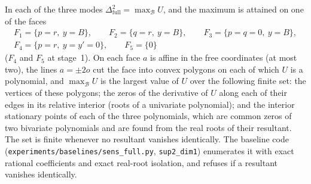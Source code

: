 \begin{lemma}\label{lem:S10d}
In each of the three modes $\Delta^2_{\mathrm{full}}=\max_{\mathcal B}U$, and the maximum is attained on one of the faces
\begin{gather*}
  F_1=\{p=r,\ y=B\},\qquad F_2=\{q=r,\ y=B\},\qquad F_3=\{p=q=0,\ y=B\},\\
  F_4=\{p=r,\ y=y'=0\},\qquad F_5=\{0\}
\end{gather*}
($F_4$ and $F_5$ at stage~1). On each face $a$ is affine in the free coordinates (at most two), the lines $a=\pm2o$ cut the face into convex polygons on each of which $U$ is a polynomial, and $\max_{\mathcal B}U$ is the largest value of $U$ over the following finite set: the vertices of these polygons; the zeros of the derivative of $U$ along each of their edges in its relative interior (roots of a univariate polynomial); and the interior stationary points of each of the three polynomials, which are common zeros of two bivariate polynomials and are found from the real roots of their resultant. The set is finite whenever no resultant vanishes identically. The baseline code (\texttt{experiments/baselines/sens\_full.py}, \texttt{sup2\_dim1}) enumerates it with exact rational coefficients and exact real-root isolation, and refuses if a resultant vanishes identically.
\end{lemma}
